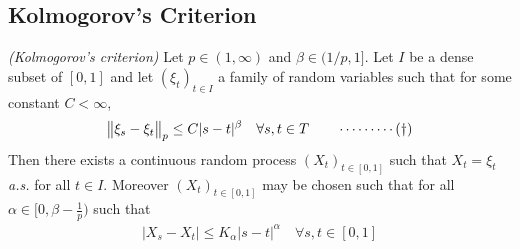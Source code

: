 \documentclass[12pt,a4paper]{report}
\begin{document}
\subsection*{Kolmogorov's Criterion}

 \emph{(Kolmogorov's criterion)} Let $p \in (1,\infty)$ and $\beta \in (1/p,1]$. Let $I$ be a dense subset of $[0,1]$ and let $(\xi_t )_{t\in I}$ a family of random variables such that for some constant $C<\infty$,
\begin{align*}
\bigl\lVert\xi_s - \xi_t\bigr\rVert_{p} \leq C|s-t|^{\beta} \quad \forall s,t\in T \quad \quad \cdots\cdots\cdots (\dagger)
\end{align*}
Then there exists a continuous random process $(X_t)_{t\in [0,1]}$ such that $X_t = \xi_t$ \emph{a.s.} for all $t\in I$. Moreover $(X_t)_{t\in [0,1]}$ may be chosen such that for all $\alpha \in [0, \beta - \frac{1}{p})$ such that
\begin{align*}
|X_s - X_t| \leq K_{\alpha} |s-t|^{\alpha} \quad \forall s,t \in [0,1]
\end{align*}
\s
\end{document}
